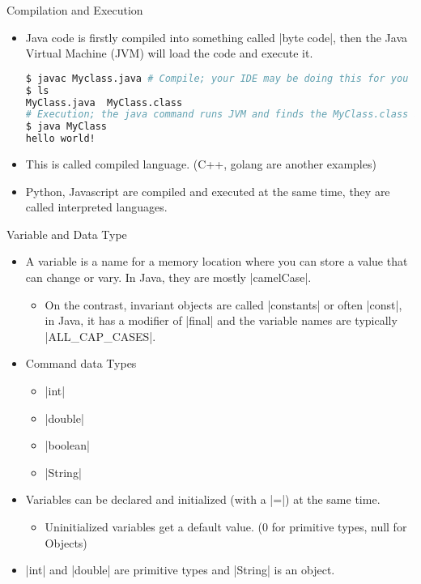 \documentclass[aspectratio=169]{beamer}
\renewcommand{\verb}{\collectverb{\color{codegreen}}}
\begin{document}
\begin{frame}[fragile]{Compilation and Execution}
\begin{itemize}
    \item Java code is firstly \alert{compiled} into something called \verb|byte code|,
        then the Java Virtual Machine (JVM) will load the code and \alert{execute} it.
        \begin{lstlisting}[language=bash]
$ javac Myclass.java # Compile; your IDE may be doing this for you
$ ls
MyClass.java  MyClass.class
# Execution; the java command runs JVM and finds the MyClass.class and its main method
$ java MyClass
hello world!
            \end{lstlisting}
    \item This is called \alert{compiled} language. (C++, golang are another examples)
    \item Python, Javascript are compiled and executed at the same time, they are called \alert{interpreted} languages.
\end{itemize}
\end{frame}

\begin{frame}[fragile]{Variable and Data Type}
\begin{itemize}
    \item A variable is a name for a memory location where you can store a value that can \alert{change or vary}. In Java, they are mostly \verb|camelCase|.
    \begin{itemize}
        \item On the contrast, invariant objects are called \verb|constants| or often \verb|const|, in Java, it has a modifier of \verb|final| and the variable names are typically \verb|ALL_CAP_CASES|.
    \end{itemize}
    \item Command data Types
    \begin{itemize}
        \item \verb|int|
        \item \verb|double|
        \item \verb|boolean|
        \item \verb|String|
    \end{itemize}
    \item Variables can be declared and initialized (with a \verb|=|) at the same time.
    \begin{itemize}
        \item Uninitialized variables get a default value. (0 for primitive types, null for Objects)
    \end{itemize}
    \item \verb|int| and \verb|double| are primitive types and \verb|String| is an object.
\end{itemize}
\end{frame}
\end{document}
